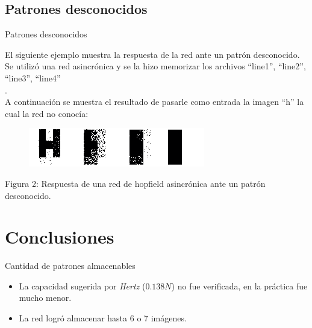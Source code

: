 \documentclass{beamer}
\begin{document}
\subsection{Patrones desconocidos}
\begin{frame}{Patrones desconocidos}

\par El siguiente ejemplo muestra la respuesta de la red ante un patrón desconocido. Se utilizó una red asincrónica y se la hizo memorizar los archivos ``line1'', ``line2'', ``line3'', ``line4''\\.\\
A continuación se muestra el resultado de pasarle como entrada la imagen ``h''  la cual la red no conocía: \\

\begin{figure}[H]
\begin{center}
\includegraphics[scale=0.60]{./images/hnoinvnopar.png}
\label{modelado}
\end{center}
\end{figure}

\begin{center}
\par Figura 2: Respuesta de una red de hopfield asincrónica ante un patrón desconocido.
\end{center}
\end{frame}

\section{Conclusiones}

\begin{frame}{Cantidad de patrones almacenables}
\begin{itemize}
\item \Large La capacidad sugerida por \textit{Hertz} ($0.138N$) no fue verificada, en la práctica fue mucho menor.
\item \Large La red logró almacenar hasta 6 o 7 imágenes.
\end{itemize}
\end{frame}
\end{document}

